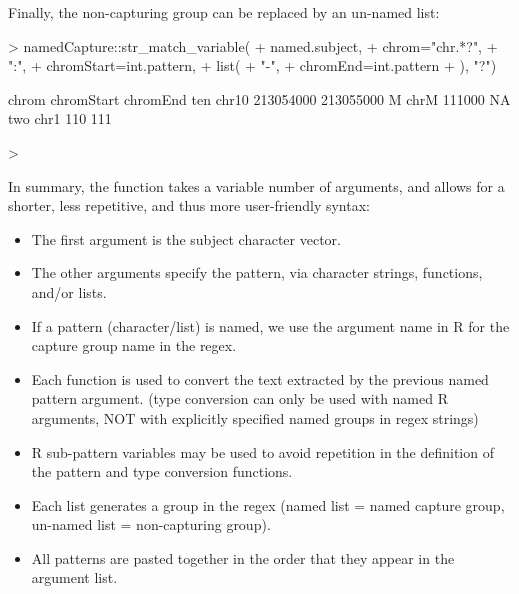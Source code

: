 Finally, the non-capturing group can be replaced by an un-named list:

\begin{Schunk}
\begin{Sinput}
> namedCapture::str_match_variable(
+   named.subject, 
+   chrom="chr.*?",
+   ":",
+   chromStart=int.pattern,
+   list(
+     "-",
+     chromEnd=int.pattern
+   ), "?")
\end{Sinput}
\begin{Soutput}
    chrom chromStart  chromEnd
ten chr10  213054000 213055000
M    chrM     111000        NA
two  chr1        110       111
\end{Soutput}
\begin{Sinput}
> 
\end{Sinput}
\end{Schunk}

In summary, the  function takes a variable number of arguments, and allows for a shorter, less repetitive, and thus more user-friendly syntax:
\begin{itemize}
\item The first argument is the subject character vector.
\item The other arguments specify the pattern, via character strings,
  functions, and/or lists.
\item If a pattern (character/list) is named, we use the argument name in R for the capture
  group name in the regex.
\item Each function is used to convert the text extracted by the previous
  named pattern argument. (type conversion can only be used with named R arguments, NOT with explicitly specified named groups in regex strings)
\item R sub-pattern variables
  may be used to avoid repetition in the definition of the pattern and type conversion functions.
\item Each list generates a group in the regex (named list = named capture group, un-named list = non-capturing group).
\item All patterns are pasted together in the order that they appear in
  the argument list.
\end{itemize}

\subsection{\sectiontrackDb}

\label{sec:trackDb}

